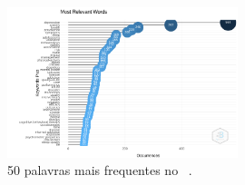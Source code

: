 \begin{figure}[htp]
    \centering
    \includegraphics[clip=true,trim={9cm 0cm 7cm 0cm },width=0.6\textwidth]{experiments/GustavoMacCar/AnaliseBibliometrica/PsychDiseasesTech/mfw.png}
    \caption{50 palavras mais frequentes no \dataset\ .}
    \label{fig:psych:mfw}
\end{figure}